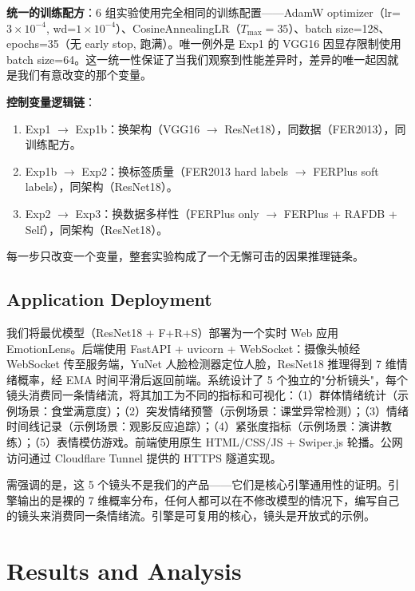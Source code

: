 \documentclass[12pt,a4paper]{article}
\begin{document}
\textbf{统一的训练配方}：6 组实验使用完全相同的训练配置——AdamW optimizer（lr=$3\times10^{-4}$, wd=$1\times10^{-4}$）、CosineAnnealingLR（$T_{\max}=35$）、batch size=128、epochs=35（无 early stop, 跑满）。唯一例外是 Exp1 的 VGG16 因显存限制使用 batch size=64。这一统一性保证了当我们观察到性能差异时，差异的唯一起因就是我们有意改变的那个变量。

\textbf{控制变量逻辑链}：
\begin{enumerate}
    \item Exp1 $\to$ Exp1b：换架构（VGG16 $\to$ ResNet18），同数据（FER2013），同训练配方。
    \item Exp1b $\to$ Exp2：换标签质量（FER2013 hard labels $\to$ FERPlus soft labels），同架构（ResNet18）。
    \item Exp2 $\to$ Exp3：换数据多样性（FERPlus only $\to$ FERPlus + RAFDB + Self），同架构（ResNet18）。
\end{enumerate}

每一步只改变一个变量，整套实验构成了一个无懈可击的因果推理链条。

\subsection{Application Deployment}

我们将最优模型（ResNet18 + F+R+S）部署为一个实时 Web 应用 EmotionLens。后端使用 FastAPI + uvicorn + WebSocket：摄像头帧经 WebSocket 传至服务端，YuNet 人脸检测器定位人脸，ResNet18 推理得到 7 维情绪概率，经 EMA 时间平滑后返回前端。系统设计了 5 个独立的"分析镜头"，每个镜头消费同一条情绪流，将其加工为不同的指标和可视化：（1）群体情绪统计（示例场景：食堂满意度）；（2）突发情绪预警（示例场景：课堂异常检测）；（3）情绪时间线记录（示例场景：观影反应追踪）；（4）紧张度指标（示例场景：演讲教练）；（5）表情模仿游戏。前端使用原生 HTML/CSS/JS + Swiper.js 轮播。公网访问通过 Cloudflare Tunnel 提供的 HTTPS 隧道实现。

需强调的是，这 5 个镜头不是我们的产品——它们是核心引擎通用性的证明。引擎输出的是裸的 7 维概率分布，任何人都可以在不修改模型的情况下，编写自己的镜头来消费同一条情绪流。引擎是可复用的核心，镜头是开放式的示例。

\section{Results and Analysis}
\end{document}

